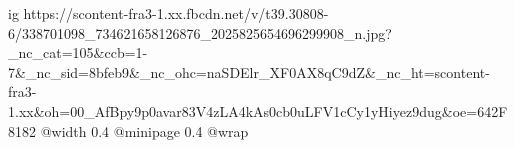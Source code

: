  
 
 
 
 

\ifcmt
  ig https://scontent-fra3-1.xx.fbcdn.net/v/t39.30808-6/338701098_734621658126876_2025825654696299908_n.jpg?_nc_cat=105&ccb=1-7&_nc_sid=8bfeb9&_nc_ohc=naSDElr_XF0AX8qC9dZ&_nc_ht=scontent-fra3-1.xx&oh=00_AfBpy9p0avar83V4zLA4kAs0cb0uLFV1cCy1yHiyez9dug&oe=642F8182
  @width 0.4
  @minipage 0.4
  @wrap \parpic[r]
\fi
